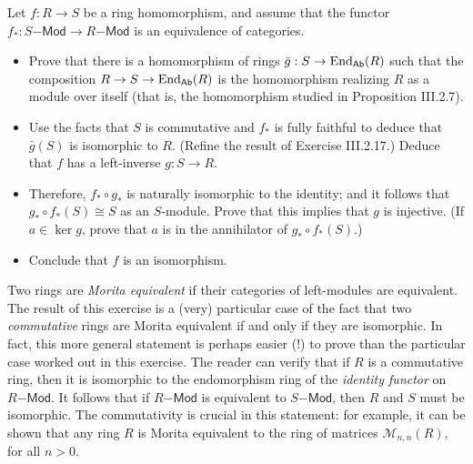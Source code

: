 \documentclass[../../master.tex]{subfiles}
\begin{document}
\begin{problem}
    Let $f: R \to S$ be a ring homomorphism, and assume that the functor $f_* : S\mathsf{-Mod} \to R\mathsf{-Mod}$ is an equivalence of categories.
    \begin{itemize}
        \item Prove that there is a homomorphism of rings $\bar{g} : S \to \operatorname{End}_{\mathsf{Ab}}(R)$ such that the composition $R \to S \to \operatorname{End}_{\mathsf{Ab}}(R)$ is the homomorphism realizing $R$ as a module over itself (that is, the homomorphism studied in Proposition III.2.7).
        \item Use the facts that $S$ is commutative and $f_*$ is fully faithful to deduce that $\bar{g}(S)$ is isomorphic to $R$.
            (Refine the result of Exercise III.2.17.)
            Deduce that $f$ has a left-inverse $g: S \to R$.
        \item Therefore, $f_* \circ g_*$ is naturally isomorphic to the identity;
            and it follows that $g_* \circ f_*(S) \cong S$ as an $S$-module.
            Prove that this implies that $g$ is injective.
            (If $a \in \ker g$, prove that $a$ is in the annihilator of $g_* \circ f_*(S)$.)
        \item Conclude that $f$ is an isomorphism.
    \end{itemize}

    Two rings are \emph{Morita equivalent} if their categories of left-modules are equivalent.
    The result of this exercise is a (very) particular case of the fact that two \emph{commutative} rings are Morita equivalent if and only if they are isomorphic.
    In fact, this more general statement is perhaps easier (!) to prove than the particular case worked out in this exercise.
    The reader can verify that if $R$ is a commutative ring, then it is isomorphic to the endomorphism ring of the \textit{identity functor} on $R\mathsf{-Mod}$.
    It follows that if $R\mathsf{-Mod}$ is equivalent to $S\mathsf{-Mod}$, then $R$ and $S$ must be isomorphic. 
    The commutativity is crucial in this statement:
    for example, it can be shown that any ring $R$ is Morita equivalent to the ring of matrices $\mathcal{M}_{n, n}(R)$, for all $n > 0$.
\end{problem}
\end{document}
